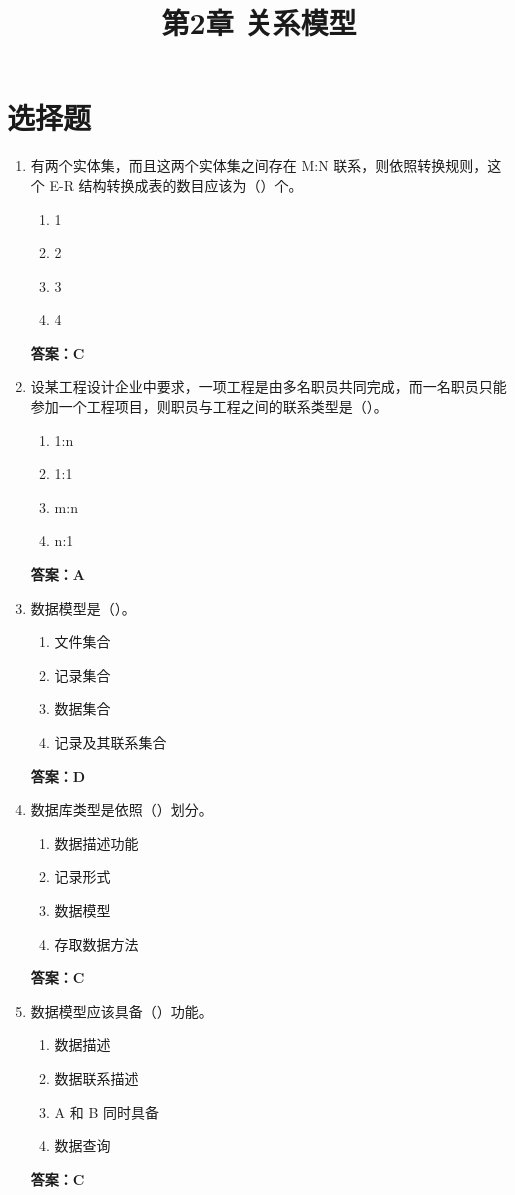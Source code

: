 \documentclass[12pt, a4paper]{article}
\title{\textbf{第2章 关系模型}}
\date{}
\begin{document}
\section{选择题}

\begin{enumerate}[label=\arabic*.]
	\item 有两个实体集，而且这两个实体集之间存在 M:N 联系，则依照转换规则，这个 E-R 结构转换成表的数目应该为（\quad）个。
	      \begin{enumerate}
		      \item 1
		      \item 2
		      \item 3
		      \item 4
	      \end{enumerate}
	      \textbf{答案：C}

	\item 设某工程设计企业中要求，一项工程是由多名职员共同完成，而一名职员只能参加一个工程项目，则职员与工程之间的联系类型是（\quad）。
	      \begin{enumerate}
		      \item 1:n
		      \item 1:1
		      \item m:n
		      \item n:1
	      \end{enumerate}
	      \textbf{答案：A}

	\item 数据模型是（\quad）。
	      \begin{enumerate}
		      \item 文件集合
		      \item 记录集合
		      \item 数据集合
		      \item 记录及其联系集合
	      \end{enumerate}
	      \textbf{答案：D}

	\item 数据库类型是依照（\quad）划分。
	      \begin{enumerate}
		      \item 数据描述功能
		      \item 记录形式
		      \item 数据模型
		      \item 存取数据方法
	      \end{enumerate}
	      \textbf{答案：C}

	\item 数据模型应该具备（\quad）功能。
	      \begin{enumerate}
		      \item 数据描述
		      \item 数据联系描述
		      \item A 和 B 同时具备
		      \item 数据查询
	      \end{enumerate}
	      \textbf{答案：C}


\end{enumerate}
\end{document}

